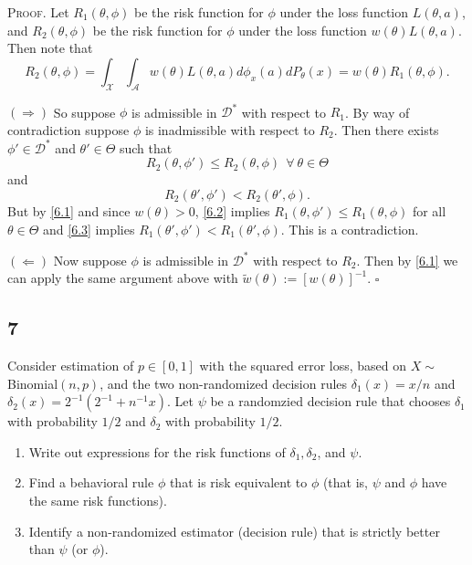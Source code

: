 \documentclass[12pt]{article}
\newcounter{ProofCounter}
\newenvironment{Proof}{\stepcounter{ProofCounter}\textsc{Proof.}}{\hfill$\square$}
\begin{document}
\begin{Proof}
  Let $R_1(\theta, \phi)$ be the risk function for $\phi$ under the loss function $L(\theta, a)$, and $R_2(\theta, \phi)$ be the risk function for
  $\phi$ under the loss function $w(\theta)L(\theta, a)$. Then note that 
  \begin{equation}
    R_2(\theta, \phi) = \int_{\mathcal{X}}\int_{\mathcal{A}}w(\theta)L(\theta, a)d\phi_x(a)dP_{\theta}(x) = w(\theta)R_1(\theta, \phi).
    \label{6.1}
  \end{equation}

  $(\Rightarrow)$ So suppose $\phi$ is admissible in $\mathcal{D}^{*}$ with respect to $R_1$. By way of contradiction suppose $\phi$ is inadmissible 
  with respect to $R_2$. Then there exists $\phi' \in \mathcal{D}^{*}$ and $\theta' \in \Theta$ such that 
  \begin{equation}
    R_2(\theta, \phi') \leq R_2(\theta, \phi) \ \ \forall \ \theta \in \Theta
    \label{6.2}
  \end{equation}
  and 
  \begin{equation}
    R_2(\theta', \phi') < R_2(\theta', \phi).
    \label{6.3}
  \end{equation}
  But by \eqref{6.1} and since $w(\theta) > 0$, \eqref{6.2} implies $R_1(\theta, \phi') \leq R_1(\theta, \phi)$ for all $\theta \in \Theta$ and \eqref{6.3} implies $R_1(\theta',
  \phi') < R_1(\theta', \phi)$. This is a contradiction.

  $(\Leftarrow)$ Now suppose $\phi$ is admissible in $\mathcal{D}^{*}$ with respect to $R_2$. Then by \eqref{6.1} we can apply the same argument above with 
  $\tilde{w}(\theta) := [w(\theta)]^{-1}$.
\end{Proof}


\newpage
\subsection*{7}
\begin{tcolorbox}
  Consider estimation of $p \in [0,1]$ with the squared error loss, based on $X\sim$Binomial$(n,p)$, and the two non-randomized decision rules
  $\delta_1(x)= x/n$ and $\delta_2(x)= 2^{-1}(  2^{-1} + n^{-1}x)$. Let $\psi$ be a randomzied decision rule that chooses $\delta_1$ with probability $1/2$ and $\delta_2$ with probability $1/2$.

  \begin{enumerate}
    \item Write out expressions for the risk functions of $\delta_1,\delta_2$, and $\psi$.
    \item Find a behavioral rule $\phi$ that is risk equivalent to $\phi$ (that is, $\psi$ and $\phi$ have the same risk functions).
    \item Identify a non-randomized estimator (decision rule) that is strictly better than $\psi$ (or $\phi$).
  \end{enumerate}
\end{tcolorbox}
\end{document}
